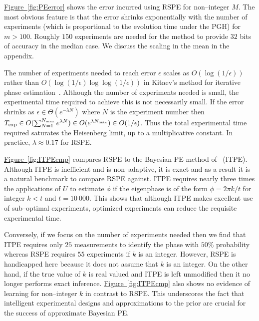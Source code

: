 \documentclass[aps,pra,amsmath,twocolumn,amssymb,superscriptaddress]{revtex4-1}
\newcommand{\eq}[1]{\hyperref[eq:#1]{(\ref*{eq:#1})}}
\newcommand{\fig}[1]{\hyperref[fig:#1]{Figure~\ref*{fig:#1}}}
\begin{document}


\fig{PEerror} shows the error incurred using RSPE for non--integer $M$.  The most obvious feature is that the error shrinks exponentially with the number of experiments (which is proportional to the evolution time under the PGH) for $m>100$.  Roughly $150$ experiments are needed for the method to provide $32$ bits of accuracy in the median case.
We discuss the scaling in the mean in the appendix.

The number of experiments needed to reach error $\epsilon$ scales as $O(\log(1/\epsilon))$ rather than $O(\log(1/\epsilon)\log\log(1/\epsilon))$ in Kitaev's method for iterative phase estimation~\cite{Kit96,kitaev2002classical}.  Although the number of experiments needed is small, the experimental time required to achieve this is not necessarily small.  If the error shrinks as $\epsilon\in \Theta(e^{-\lambda N})$ where $N$ is the experiment number then $T_{\exp}\in O(\sum_{N=1}^{N_{\rm max}}e^{\lambda N})\in O(e^{\lambda N_{\rm max}})\in O(1/\epsilon)$.  Thus the total experimental time required saturates the Heisenberg limit, up to a multiplicative constant.  In practice, $\lambda\approx 0.17$ for RSPE.

\fig{ITPEcmp} compares RSPE to the Bayesian PE method of~\cite{SHF14} (ITPE).  Although ITPE is inefficient and is non--adaptive, it is exact and as a result it is a natural benchmark to compare RSPE against.  ITPE requires nearly three times the applications of $U$ to estimate $\phi$ if the eigenphase is of the form $\phi=2\pi k/t$ for integer $k<t$ and $t=10~000$.  
This shows that although ITPE makes excellent use of sub--optimal experiments, optimized experiments can reduce the requisite experimental time.

Conversely, if we focus on the number of experiments needed then we find that  ITPE requires only $25$ measurements to identify the phase with $50\%$ probability whereas RSPE requires $55$ experiments if $k$ is an integer.  However, RSPE is handicapped here because it does not assume that $k$ is an integer.  On the other hand, if the true value of $k$ is real valued and ITPE is left unmodified then it no longer performs exact inference.  \fig{ITPEcmp} also shows no evidence of learning for non--integer $k$ in contrast to RSPE.  This underscores the fact that intelligent experimental designs and approximations to the prior are crucial for the success of approximate Bayesian PE.
\end{document}

